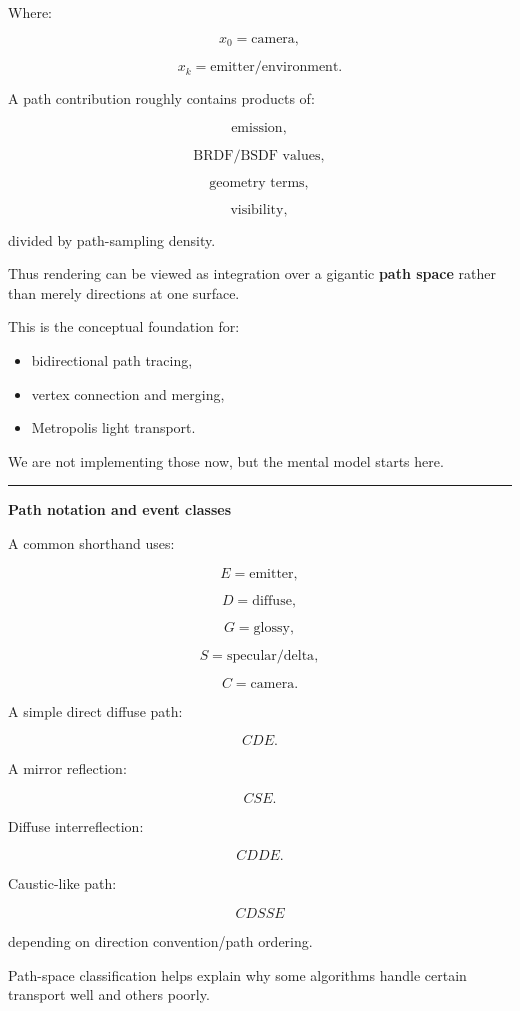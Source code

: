 Where:

\[
x_0=\text{camera},
\]

\[
x_k=\text{emitter/environment}.
\]

A path contribution roughly contains products of:

\[
\text{emission},
\]

\[
\text{BRDF/BSDF values},
\]

\[
\text{geometry terms},
\]

\[
\text{visibility},
\]

divided by path-sampling density.

Thus rendering can be viewed as integration over a gigantic \textbf{path space} rather than merely directions at one surface.

This is the conceptual foundation for:

\begin{itemize}
\tightlist
\item
  bidirectional path tracing,
\item
  vertex connection and merging,
\item
  Metropolis light transport.
\end{itemize}

We are not implementing those now, but the mental model starts here.

\begin{center}\rule{0.5\linewidth}{0.5pt}\end{center}

\textbf{Path notation and event classes}

A common shorthand uses:

\[
E=\text{emitter},
\]

\[
D=\text{diffuse},
\]

\[
G=\text{glossy},
\]

\[
S=\text{specular/delta},
\]

\[
C=\text{camera}.
\]

A simple direct diffuse path:

\[
CDE.
\]

A mirror reflection:

\[
CSE.
\]

Diffuse interreflection:

\[
CDDE.
\]

Caustic-like path:

\[
CDSSE
\]

depending on direction convention/path ordering.

Path-space classification helps explain why some algorithms handle certain transport well and others poorly.

